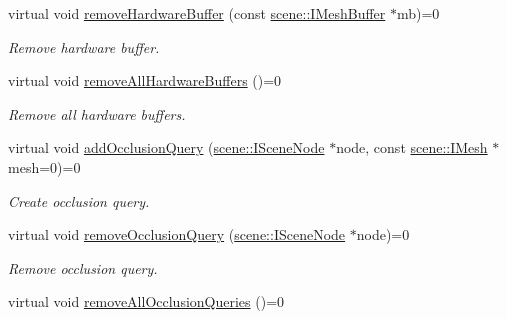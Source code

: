 \begin{DoxyCompactItemize}
\mbox{\label{classirr_1_1video_1_1IVideoDriver_a1454ef5ba92de420f35678e2803485f6}} 
virtual void \hyperlink{classirr_1_1video_1_1IVideoDriver_a1454ef5ba92de420f35678e2803485f6}{remove\+Hardware\+Buffer} (const \hyperlink{classirr_1_1scene_1_1IMeshBuffer}{scene\+::\+I\+Mesh\+Buffer} $\ast$mb)=0
\begin{DoxyCompactList}\small\item\em Remove hardware buffer. \end{DoxyCompactList}\item 
\mbox{\label{classirr_1_1video_1_1IVideoDriver_a2538b3163d6e072f5b3deb905cb2abb0}} 
virtual void \hyperlink{classirr_1_1video_1_1IVideoDriver_a2538b3163d6e072f5b3deb905cb2abb0}{remove\+All\+Hardware\+Buffers} ()=0
\begin{DoxyCompactList}\small\item\em Remove all hardware buffers. \end{DoxyCompactList}\item 
virtual void \hyperlink{classirr_1_1video_1_1IVideoDriver_a07f15814e039772ee43be272e97d1633}{add\+Occlusion\+Query} (\hyperlink{classirr_1_1scene_1_1ISceneNode}{scene\+::\+I\+Scene\+Node} $\ast$node, const \hyperlink{classirr_1_1scene_1_1IMesh}{scene\+::\+I\+Mesh} $\ast$mesh=0)=0
\begin{DoxyCompactList}\small\item\em Create occlusion query. \end{DoxyCompactList}\item 
\mbox{\label{classirr_1_1video_1_1IVideoDriver_a9f7d9cec8356edf3e16e264e476d849a}} 
virtual void \hyperlink{classirr_1_1video_1_1IVideoDriver_a9f7d9cec8356edf3e16e264e476d849a}{remove\+Occlusion\+Query} (\hyperlink{classirr_1_1scene_1_1ISceneNode}{scene\+::\+I\+Scene\+Node} $\ast$node)=0
\begin{DoxyCompactList}\small\item\em Remove occlusion query. \end{DoxyCompactList}\item 
\mbox{\label{classirr_1_1video_1_1IVideoDriver_a5d77478ed4e0896fd2fd8b8d042dc1ff}} 
virtual void \hyperlink{classirr_1_1video_1_1IVideoDriver_a5d77478ed4e0896fd2fd8b8d042dc1ff}{remove\+All\+Occlusion\+Queries} ()=0

\end{DoxyCompactItemize}
